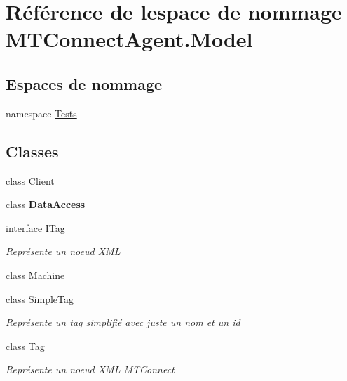 \hypertarget{namespace_m_t_connect_agent_1_1_model}{}\section{Référence de l\textquotesingle{}espace de nommage M\+T\+Connect\+Agent.\+Model}
\label{namespace_m_t_connect_agent_1_1_model}
\subsection*{Espaces de nommage}
\begin{DoxyCompactItemize}
\item 
namespace \mbox{\hyperlink{namespace_m_t_connect_agent_1_1_model_1_1_tests}{Tests}}
\end{DoxyCompactItemize}
\subsection*{Classes}
\begin{DoxyCompactItemize}
\item 
class \mbox{\hyperlink{class_m_t_connect_agent_1_1_model_1_1_client}{Client}}
\item 
class {\bfseries Data\+Access}
\item 
interface \mbox{\hyperlink{interface_m_t_connect_agent_1_1_model_1_1_i_tag}{I\+Tag}}
\begin{DoxyCompactList}\small\item\em Représente un noeud X\+ML \end{DoxyCompactList}\item 
class \mbox{\hyperlink{class_m_t_connect_agent_1_1_model_1_1_machine}{Machine}}
\item 
class \mbox{\hyperlink{class_m_t_connect_agent_1_1_model_1_1_simple_tag}{Simple\+Tag}}
\begin{DoxyCompactList}\small\item\em Représente un tag simplifié avec juste un nom et un id \end{DoxyCompactList}\item 
class \mbox{\hyperlink{class_m_t_connect_agent_1_1_model_1_1_tag}{Tag}}
\begin{DoxyCompactList}\small\item\em Représente un noeud X\+ML M\+T\+Connect \end{DoxyCompactList}\end{DoxyCompactItemize}

